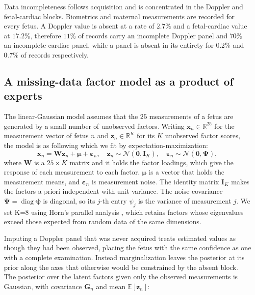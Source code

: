 \documentclass[a4paper,fleqn]{cas-sc}
\begin{document}
Data incompleteness follows acquisition and is concentrated in the Doppler and fetal-cardiac blocks. Biometrics and maternal measurements are recorded for every fetus. A Doppler value is absent at a rate of $2.7\%$ and a fetal-cardiac value at $17.2\%$, therefore $11\%$ of records carry an incomplete Doppler panel and $70\%$ an incomplete cardiac panel, while a panel is absent in its entirety for $0.2\%$ and $0.7\%$ of records respectively.

\subsection{A missing-data factor model as a product of experts} The linear-Gaussian model assumes that the $25$ measurements of a fetus are generated by a small number of unobserved factors. Writing $\mathbf{x}_n\in\mathbb{R}^{25}$ for the measurement vector of fetus $n$ and $\mathbf{z}_n\in\mathbb{R}^{K}$ for its $K$ unobserved factor scores, the model is as following which we fit by expectation-maximization: \begin{equation} \mathbf{x}_n=\mathbf{W}\mathbf{z}_n+\boldsymbol{\mu}+\boldsymbol{\varepsilon}_n,\quad \mathbf{z}_n\sim\mathcal{N}(\mathbf{0},\mathbf{I}_K),\quad \boldsymbol{\varepsilon}_n\sim\mathcal{N}(\mathbf{0},\boldsymbol{\Psi}), \label{eq:fa} \end{equation} where $\mathbf{W}$ is a $25\times K$ matrix and it holds the factor loadings, which give the response of each measurement to each factor. $\boldsymbol{\mu}$ is a vector that holds the measurement means, and $\boldsymbol{\varepsilon}_n$ is measurement noise. The identity matrix $\mathbf{I}_K$ makes the factors a priori independent with unit variance. The noise covariance $\boldsymbol{\Psi}=\operatorname{diag}\boldsymbol{\psi}$ is diagonal, so its $j$-th entry $\psi_j$ is the variance of measurement $j$. We set K=8 using Horn's parallel analysis \cite{ref:stats}, which retains factors whose eigenvalues exceed those expected from random data of the same dimensions.

Imputing a Doppler panel that was never acquired treats estimated values as though they had been observed, placing the fetus with the same confidence as one with a complete examination. Instead marginalization leaves the posterior at its prior along the axes that otherwise would be constrained by the absent block. The posterior over the latent factors given only the observed measurements is Gaussian, with covariance $\mathbf{G}_n$ and mean $\mathbb{E}[\mathbf{z}_n]$:
\end{document}
